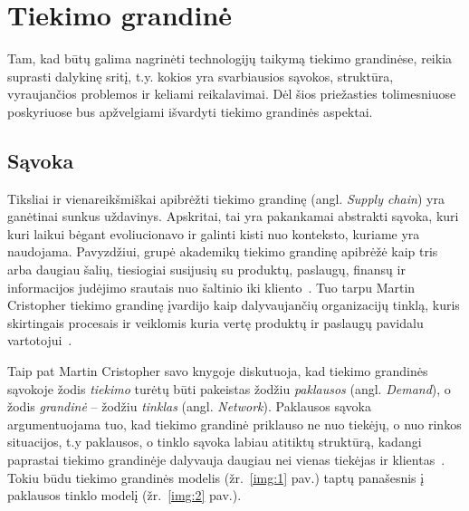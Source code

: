 
\section {Tiekimo grandinė} \label{section:supply-chain}

Tam, kad būtų galima nagrinėti technologijų taikymą tiekimo grandinėse, reikia suprasti dalykinę sritį, t.y. kokios yra svarbiausios sąvokos, struktūra, vyraujančios problemos ir keliami reikalavimai. Dėl šios priežasties tolimesniuose poskyriuose bus apžvelgiami išvardyti tiekimo grandinės aspektai.




\subsection{Sąvoka} \label{subsection:definition}

Tiksliai ir vienareikšmiškai apibrėžti tiekimo grandinę (angl. \textit{Supply chain}) yra ganėtinai sunkus uždavinys. Apskritai, tai yra pakankamai abstrakti sąvoka, kuri kuri laikui bėgant evoliucionavo ir galinti kisti nuo konteksto, kuriame yra naudojama. Pavyzdžiui, grupė akademikų tiekimo grandinę apibrėžė kaip tris arba daugiau šalių, tiesiogiai susijusių su produktų, paslaugų, finansų ir informacijos judėjimo srautais nuo šaltinio iki kliento~\cite{mentzer2001defining}. Tuo tarpu Martin Cristopher tiekimo grandinę įvardijo kaip dalyvaujančių organizacijų tinklą, kuris skirtingais procesais ir veiklomis kuria vertę produktų ir paslaugų pavidalu vartotojui~\cite{christopher2016logistics}. 

Taip pat Martin Cristopher savo knygoje diskutuoja, kad tiekimo grandinės sąvokoje žodis \textit{tiekimo} turėtų būti pakeistas žodžiu \textit{paklausos} (angl. \textit{Demand}), o žodis \textit{grandinė} – žodžiu \textit{tinklas} (angl. \textit{Network}). Paklausos sąvoka argumentuojama tuo, kad tiekimo grandinė priklauso ne nuo tiekėjų, o nuo rinkos situacijos, t.y paklausos, o tinklo sąvoka labiau atitiktų struktūrą, kadangi paprastai tiekimo grandinėje dalyvauja daugiau nei vienas tiekėjas ir klientas~\cite{christopher2016logistics}. Tokiu būdu tiekimo grandinės modelis (žr.~\ref{img:1} pav.) taptų panašesnis į paklausos tinklo modelį (žr.~\ref{img:2} pav.).

